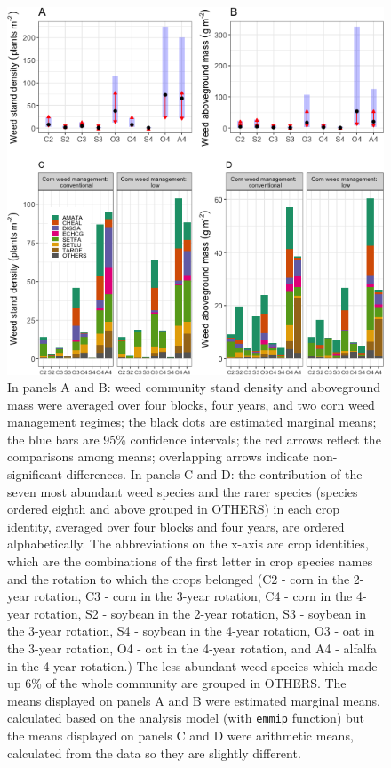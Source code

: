 \documentclass[
]{article}
\begin{document}
\begin{figure}
\centering
\includegraphics{Manuscript_whole_files/figure-latex/all-sp-dens-biom-1.png}
\caption{\label{fig:all-sp-dens-biom}In panels A and B: weed community stand density and aboveground mass were averaged over four blocks, four years, and two corn weed management regimes; the black dots are estimated marginal means; the blue bars are 95\% confidence intervals; the red arrows reflect the comparisons among means; overlapping arrows indicate non-significant differences. In panels C and D: the contribution of the seven most abundant weed species and the rarer species (species ordered eighth and above grouped in OTHERS) in each crop identity, averaged over four blocks and four years, are ordered alphabetically. The abbreviations on the x-axis are crop identities, which are the combinations of the first letter in crop species names and the rotation to which the crops belonged (C2 - corn in the 2-year rotation, C3 - corn in the 3-year rotation, C4 - corn in the 4-year rotation, S2 - soybean in the 2-year rotation, S3 - soybean in the 3-year rotation, S4 - soybean in the 4-year rotation, O3 - oat in the 3-year rotation, O4 - oat in the 4-year rotation, and A4 - alfalfa in the 4-year rotation.) The less abundant weed species which made up 6\% of the whole community are grouped in OTHERS. The means displayed on panels A and B were estimated marginal means, calculated based on the analysis model (with \texttt{emmip} function) but the means displayed on panels C and D were arithmetic means, calculated from the data so they are slightly different.}
\end{figure}
\end{document}

